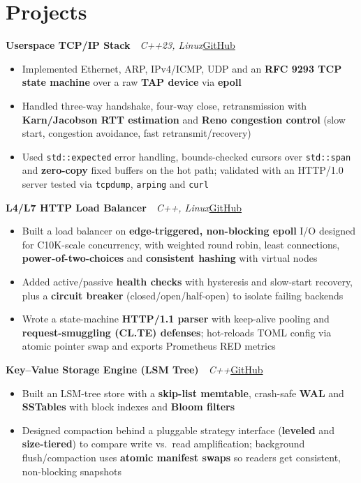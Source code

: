 \documentclass[10pt,a4paper]{article}
\newcommand{\lnk}[2]{\href{#1}{\color{accent}#2}}
\newcommand{\project}[3]{\vspace{5pt}\textbf{#1}\ \ {\small\textit{#2}}\hfill{\small #3}\vspace{-1pt}}
\begin{document}
\section{Projects}
\project{Userspace TCP/IP Stack}{C++23, Linux}{\lnk{https://github.com/Adityaa-Saha17/TCP-IP}{GitHub}}
\begin{itemize}
  \item Implemented Ethernet, ARP, IPv4/ICMP, UDP and an \textbf{RFC 9293 TCP state machine} over a raw \textbf{TAP device} via \textbf{epoll}
  \item Handled three-way handshake, four-way close, retransmission with \textbf{Karn/Jacobson RTT estimation} and \textbf{Reno congestion control} (slow start, congestion avoidance, fast retransmit/recovery)
  \item Used \texttt{std::expected} error handling, bounds-checked cursors over \texttt{std::span} and \textbf{zero-copy} fixed buffers on the hot path; validated with an HTTP/1.0 server tested via \texttt{tcpdump}, \texttt{arping} and \texttt{curl}
\end{itemize}

\project{L4/L7 HTTP Load Balancer}{C++, Linux}{\lnk{https://github.com/Adityaa-Saha17/Load-Balancer}{GitHub}}
\begin{itemize}
  \item Built a load balancer on \textbf{edge-triggered, non-blocking epoll} I/O designed for C10K-scale concurrency, with weighted round robin, least connections, \textbf{power-of-two-choices} and \textbf{consistent hashing} with virtual nodes
  \item Added active/passive \textbf{health checks} with hysteresis and slow-start recovery, plus a \textbf{circuit breaker} (closed/open/half-open) to isolate failing backends
  \item Wrote a state-machine \textbf{HTTP/1.1 parser} with keep-alive pooling and \textbf{request-smuggling (CL.TE) defenses}; hot-reloads TOML config via atomic pointer swap and exports Prometheus RED metrics
\end{itemize}

\project{Key--Value Storage Engine (LSM Tree)}{C++}{\lnk{https://github.com/Adityaa-Saha17/KV-Storing-engine-with-LSM-Tree}{GitHub}}
\begin{itemize}
  \item Built an LSM-tree store with a \textbf{skip-list memtable}, crash-safe \textbf{WAL} and \textbf{SSTables} with block indexes and \textbf{Bloom filters}
  \item Designed compaction behind a pluggable strategy interface (\textbf{leveled} and \textbf{size-tiered}) to compare write vs.\ read amplification; background flush/compaction uses \textbf{atomic manifest swaps} so readers get consistent, non-blocking snapshots
\end{itemize}
\end{document}
